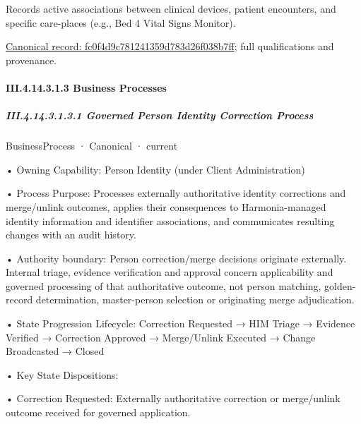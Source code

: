 Records active associations between clinical devices, patient encounters, and specific care-places (e.g., Bed 4 Vital Signs Monitor).


{\footnotesize \href{../../../../continuum/business/business-function/fc0f4d9c781241359d783d26f038b7ff.md}{Canonical record: fc0f4d9c781241359d783d26f038b7ff}; full qualifications and provenance.}\par
\paragraph*{III.4.14.3.1.3 Business Processes}
\label{navigation:III.4.14.3.1.3}

\subparagraph*{III.4.14.3.1.3.1 Governed Person Identity Correction Process}
\label{navigation:III.4.14.3.1.3.1}

\label{element:72f3c63da45d44868579a3bb15d1568c}
{\small BusinessProcess · Canonical · current}\par

•
Owning Capability: Person Identity (under Client Administration)



•
Process Purpose: Processes externally authoritative identity corrections and merge/unlink outcomes, applies their consequences to Harmonia-managed identity information and identifier associations, and communicates resulting changes with an audit history.



•
Authority boundary: Person correction/merge decisions originate externally. Internal triage, evidence verification and approval concern applicability and governed processing of that authoritative outcome, not person matching, golden-record determination, master-person selection or originating merge adjudication.



•
State Progression Lifecycle: Correction Requested → HIM Triage → Evidence Verified → Correction Approved → Merge/Unlink Executed → Change Broadcasted → Closed



•
Key State Dispositions:



•
Correction Requested: Externally authoritative correction or merge/unlink outcome received for governed application.



